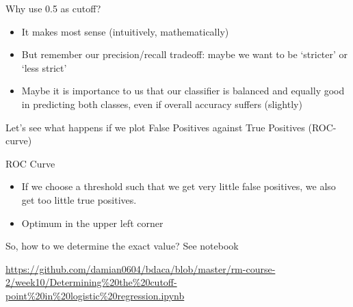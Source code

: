 \documentclass{beamer}
\begin{document}
\begin{frame}{Why use 0.5 as cutoff?}
\begin{itemize}[<+->]
	\item It makes most sense (intuitively, mathematically)
	\item But remember our precision/recall tradeoff: maybe we want to be `stricter' or `less strict'
	\item Maybe it is importance to us that our classifier is balanced and equally good in predicting both classes, even if overall accuracy suffers (slightly) 
\end{itemize}
\pause
Let's see what happens if we plot False Positives against True Positives (ROC-curve)
\end{frame}


\begin{frame}{ROC Curve}
\begin{itemize}
	\item If we choose a threshold such that we get very little false positives, we also get too little true positives.
	\item Optimum in the upper left corner
\end{itemize}

\end{frame}


\begin{frame}{So, how to we determine the exact value? }
See notebook

\url{https://github.com/damian0604/bdaca/blob/master/rm-course-2/week10/Determining\%20the\%20cutoff-point\%20in\%20logistic\%20regression.ipynb}
\end{frame}
\end{document}
